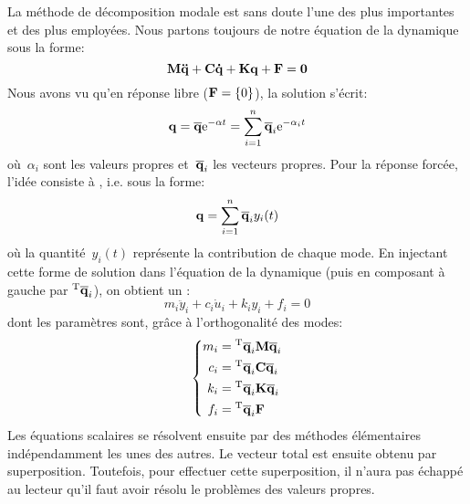 La méthode de décomposition modale est sans doute l'une des plus importantes et des plus
employées.
\medskipvm
Nous partons toujours de notre équation de la dynamique sous la forme:
\begin{equation} \MM{M}\VV{\ddot{q}}+\MM{C}\VV{\dot{q}}+\MM{K}\VV{q}+\VV{F} = \VV{0} \end{equation}
\medskipvm
Nous avons vu qu'en réponse libre ($\VV{F}=\{0\}$), la solution s'écrit:
\begin{equation} \VV{q} = \VV{\overline{q}} \mathrm{e}^{-\alpha t} = \dsum_{i=1}^n \VV{\overline{q}}_i \mathrm{e}^{-\alpha_i t} \end{equation}
où~$\alpha_i$ sont les valeurs propres et~$\VV{\overline{q}}_i$ les vecteurs propres.
\medskipvm
Pour la réponse forcée, l'idée consiste à , i.e. sous la forme:
\begin{equation} \VV{q} = \dsum_{i=1}^n \VV{\overline{q}}_i y_i(t) \end{equation}
où la quantité~$y_i(t)$ représente la contribution de chaque mode.
\medskipvm
En injectant cette forme de solution dans l'équation de la dynamique (puis en composant à gauche par ${}^\mathrm{T}\mathbf{\overline{q}}_i$), on obtient un :
\begin{equation} m_i\ddot{y}_i+c_i\dot{u}_i+k_iy_i+f_i = 0 \end{equation}
dont les paramètres sont, grâce à l'orthogonalité des modes:
\begin{equation}\left\{
\begin{aligned}
	m_i &= \LL{\overline{q}}_i\MM{M}\VV{\overline{q}}_i\\
	c_i &= \LL{\overline{q}}_i\MM{C}\VV{\overline{q}}_i\\
	k_i &= \LL{\overline{q}}_i\MM{K}\VV{\overline{q}}_i\\
	f_i &= \LL{\overline{q}}_i\VV{F}
\end{aligned}
\right.\end{equation}
Les équations scalaires se résolvent ensuite par des méthodes élémentaires indépendamment les unes des autres. Le vecteur total est ensuite obtenu par superposition.
\medskipvm
Toutefois, pour effectuer cette superposition, il n'aura pas échappé au lecteur qu'il faut avoir résolu le problèmes des valeurs propres.
